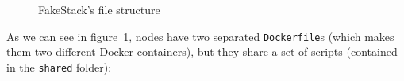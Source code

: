 \begin{figure}[H]
\label{fig:fakestack_tree}
\caption{FakeStack's file structure}
\end{figure}

As we can see in figure~\ref{fig:fakestack_tree}, nodes have two separated \texttt{Dockerfile}s (which makes them two different Docker containers), but they share a set of scripts (contained in the \texttt{shared} folder):

